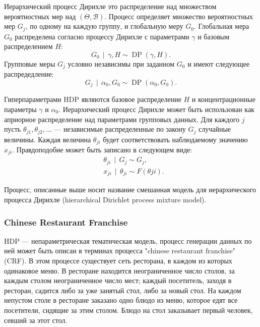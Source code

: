 \documentclass[12pt, a4paper]{article}
\newcommand\todo[1]{\marginpar{\textcolor{red}{#1}}}
\DeclareMathOperator{\DP}{DP}
\DeclareMathOperator{\svert}{\,\vert\,}
\begin{document}
  Иерархический процесс Дирихле это распределение над множеством вероятностных мер над $(\Theta, \mathcal{B})$. Процесс определяет множество вероятностных мер $G_j$, по одному на каждую группу, и глобальную меру $G_0$. Глобальная мера $G_0$ распределена согласно процессу Дирихле с параметрами $\gamma$ и базовым распределением $H$:
  \begin{equation}
  G_0 \svert \gamma, H \sim \DP(\gamma, H).
  \end{equation}
  Групповые меры $G_j$ условно независимы при заданном $G_0$ и имеют следующее распредедление:
  \begin{equation}
  G_j \svert \alpha_0, G_0 \sim \DP(\alpha_0, G_0).
  \end{equation}
  
  Гиперпараметрами HDP являются базовое распределение $H$ и концентрационные параметры $\gamma$ и $\alpha_0$.
  Иерархический процесс Дирихле может быть использован как априорное распределение над параметрами групповых данных. Для каждого $j$ пусть $\theta_{j1}, \theta_{j2}, \ldots$ --- независимые распределенные по закону $G_j$ случайные величины. Каждая величина $\theta_{ji}$ будет соответствовать наблюдаемому значению $x_{ji}$. Правдоподобие может быть записано в следующем виде:
  \begin{equation}
  \begin{aligned}
  & \theta_{ji} \svert G_j \sim G_j, \\
  & x_{ji} \svert \theta_{ji} \sim F(\theta{ji}).
  \end{aligned}
  \end{equation}
  
  Процесс, описанные выше носит название смешанная модель для иерархического процесса Дирихле (hierarchical Dirichlet process mixture model)\cite{hdp-1}.
  
  \subsubsection{Chinese Restaurant Franchise}

\todo{Картинка к CRF}  
  
  HDP --- непараметрическая тематическая модель, процесс генерации данных по ней может быть описан в терминах процесса "chinese restaurant franchise" (CRF). В этом процессе существует сеть ресторана, в каждом из которых одинаковое меню. В ресторане находится неограниченное число столов, за каждым столом неограниченное число мест; каждый посетитель, заходя в ресторан, садится либо за уже занятый стол, либо за новый стол. На каждом непустом столе в ресторане заказано одно блюдо из меню, которое едят все посетители, сидящие за этим столом. Блюдо на стол заказывает первый человек, севший за этот стол.
  
\end{document}
